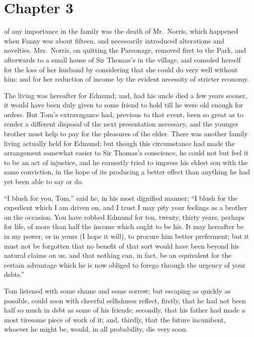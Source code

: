 \chapter{Chapter 3}

 of any importance in the family was
the death of Mr.\ Norris, which happened when Fanny was
about fifteen, and necessarily introduced alterations
and novelties.  Mrs.\ Norris, on quitting the Parsonage,
removed first to the Park, and afterwards to a small house
of Sir Thomas's in the village, and consoled herself
for the loss of her husband by considering that she
could do very well without him; and for her reduction
of income by the evident necessity of stricter economy.

The living was hereafter for Edmund; and, had his uncle
died a few years sooner, it would have been duly given
to some friend to hold till he were old enough for orders.
But Tom's extravagance had, previous to that event,
been so great as to render a different disposal of the
next presentation necessary, and the younger brother
must help to pay for the pleasures of the elder.
There was another family living actually held for Edmund;
but though this circumstance had made the arrangement
somewhat easier to Sir Thomas's conscience, he could not
but feel it to be an act of injustice, and he earnestly
tried to impress his eldest son with the same conviction,
in the hope of its producing a better effect than anything he
had yet been able to say or do.

``I blush for you, Tom,'' said he, in his most dignified manner;
``I blush for the expedient which I am driven on, and I trust
I may pity your feelings as a brother on the occasion.
You have robbed Edmund for ten, twenty, thirty years,
perhaps for life, of more than half the income which ought
to be his.  It may hereafter be in my power, or in yours
(I hope it will), to procure him better preferment;
but it must not be forgotten that no benefit of that
sort would have been beyond his natural claims on us,
and that nothing can, in fact, be an equivalent for the
certain advantage which he is now obliged to forego
through the urgency of your debts.''

Tom listened with some shame and some sorrow;
but escaping as quickly as possible, could soon with
cheerful selfishness reflect, firstly, that he had
not been half so much in debt as some of his friends;
secondly, that his father had made a most tiresome piece
of work of it; and, thirdly, that the future incumbent,
whoever he might be, would, in all probability, die very soon.

